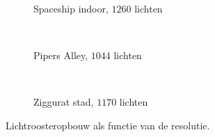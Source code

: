 \begin{figure}[t]
\begin{minipage}[t]{0.5\textwidth}
\begin{adjustbox}{minipage=\textwidth, scale=0.55}
    \begin{subfigure}[b]{1.6\textwidth}
      \centering
      \def\svgwidth{\textwidth}
      
      \caption{Spaceship indoor, $1260$ lichten}
      \vspace{4pt}
      \label{fig:ts-resolution-grid:indoor}
    \end{subfigure}
  \end{adjustbox} \\
  \begin{adjustbox}{minipage=\textwidth, scale=0.55}
    \begin{subfigure}[b]{1.6\textwidth}
      \centering
      \def\svgwidth{\textwidth}
      
      \caption{Pipers Alley, $1044$ lichten}
      \vspace{4pt}
      \label{fig:ts-resolution-grid:alley}
    \end{subfigure}
  \end{adjustbox} \\
  \begin{adjustbox}{minipage=\textwidth, scale=0.55}
    \begin{subfigure}[b]{1.6\textwidth}
      \centering
      \def\svgwidth{\textwidth}
      
      \caption{Ziggurat stad, $1170$ lichten}
      \label{fig:ts-resolution-grid:city}
    \end{subfigure}
  \end{adjustbox}
  \caption{\small Lichtroosteropbouw als functie van de resolutie. }
  \label{fig:ts-resolution-grid}
  \end{minipage}
\end{figure}

